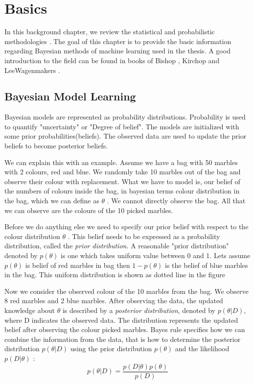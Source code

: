 

\chapter{Basics}

In this background chapter, we review the statistical and probabilistic methodologies .
The goal of this chapter is to provide the basic information regarding Bayesian methods of machine learning used in the thesis. A good introduction to the field can be found in books of Bishop \cite{}, Kirchop \cite{} and LeeWagenmakers \cite{} . 

\section{Bayesian Model Learning}

Bayesian models are represented as probability distributions. Probability is used to quantify "uncertainty" or "Degree of belief". The models are initialized with some prior probabilities(beliefs). The observed data are used to update the prior beliefs to become posterior beliefs.

We can explain this with an example. Assume we have a bag with 50 marbles with 2 colours, red and blue. We randomly take 10 marbles out of the bag and observe their colour with replacement. What we have to model is, our belief of the numbers of colours inside the bag, in bayesian  terms colour distribution in the bag, which we can define as $\theta$ . We cannot directly observe the bag. All that we can observe are the colours of the 10 picked marbles.

Before we do anything else we need to specify our prior belief with respect to the colour distribution $\theta$ . This belief needs to be expressed as a probability distribution, called the \emph{prior distribution}. A reasonable "prior distribution" denoted by $p(\theta)$ is one which takes uniform value between 0 and 1. Lets assume $p(\theta)$ is belief of red marbles in bag then $1 - p(\theta)$  is the belief of blue marbles in the bag. This uniform distribution is shown as dotted line in the figure 

Now we consider the observed colour of the 10 marbles from the bag. We observe 8 red marbles and 2 blue marbles. After observing the data, the updated knowledge about $\theta$ is described by a \emph{posterior distribution}, denoted by $p(\theta | D)$, where D indicates the observed data. The distribution represents the updated belief after observing the colour picked marbles. Bayes rule specifies how we can combine the information from the data, that is how to determine the posterior distribution $p (\theta | D)$ using  the prior distribution $p(\theta)$ and the likelihood  $p (D | \theta)$ :
\begin{equation}
	p(\theta | D) = \frac{p(D | \theta) p(\theta)}{p(D)}
\end{equation}

